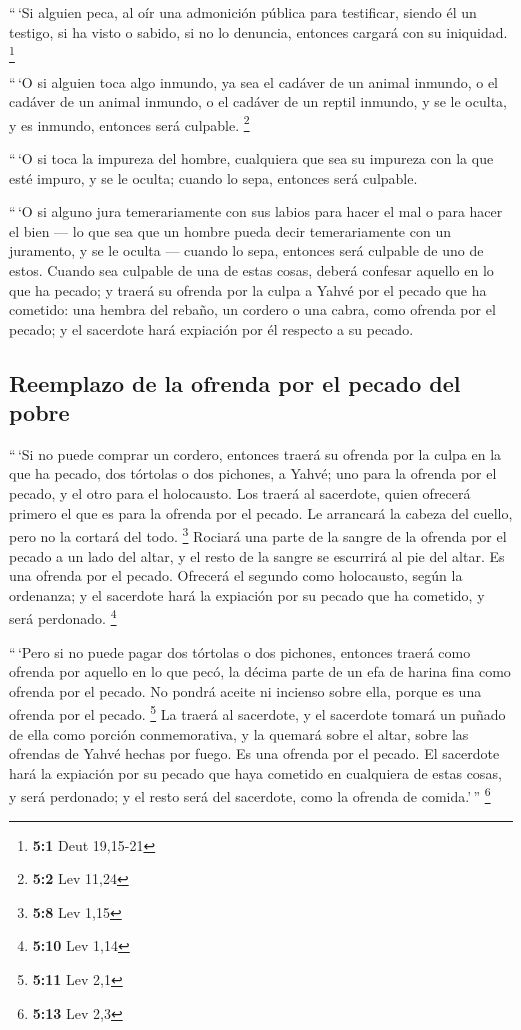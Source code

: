  ``\,`Si alguien peca, al oír una admonición pública para
testificar, siendo él un testigo, si ha visto o sabido, si no lo
denuncia, entonces cargará con su iniquidad. \footnote{\textbf{5:1} Deut
  19,15-21}

 ``\,`O si alguien toca algo inmundo, ya sea el cadáver de
un animal inmundo, o el cadáver de un animal inmundo, o el cadáver de un
reptil inmundo, y se le oculta, y es inmundo, entonces será culpable.
\footnote{\textbf{5:2} Lev 11,24}

 ``\,`O si toca la impureza del hombre, cualquiera que sea
su impureza con la que esté impuro, y se le oculta; cuando lo sepa,
entonces será culpable.

 ``\,`O si alguno jura temerariamente con sus labios para
hacer el mal o para hacer el bien --- lo que sea que un hombre pueda
decir temerariamente con un juramento, y se le oculta --- cuando lo
sepa, entonces será culpable de uno de estos.  Cuando sea
culpable de una de estas cosas, deberá confesar aquello en lo que ha
pecado;  y traerá su ofrenda por la culpa a Yahvé por el
pecado que ha cometido: una hembra del rebaño, un cordero o una cabra,
como ofrenda por el pecado; y el sacerdote hará expiación por él
respecto a su pecado.

\hypertarget{reemplazo-de-la-ofrenda-por-el-pecado-del-pobre}{%
\subsection{Reemplazo de la ofrenda por el pecado del
pobre}\label{reemplazo-de-la-ofrenda-por-el-pecado-del-pobre}}

 ``\,`Si no puede comprar un cordero, entonces traerá su
ofrenda por la culpa en la que ha pecado, dos tórtolas o dos pichones, a
Yahvé; uno para la ofrenda por el pecado, y el otro para el holocausto.
 Los traerá al sacerdote, quien ofrecerá primero el que es
para la ofrenda por el pecado. Le arrancará la cabeza del cuello, pero
no la cortará del todo. \footnote{\textbf{5:8} Lev 1,15} 
Rociará una parte de la sangre de la ofrenda por el pecado a un lado del
altar, y el resto de la sangre se escurrirá al pie del altar. Es una
ofrenda por el pecado.  Ofrecerá el segundo como
holocausto, según la ordenanza; y el sacerdote hará la expiación por su
pecado que ha cometido, y será perdonado. \footnote{\textbf{5:10} Lev
  1,14}

 ``\,`Pero si no puede pagar dos tórtolas o dos pichones,
entonces traerá como ofrenda por aquello en lo que pecó, la décima parte
de un efa de harina fina como ofrenda por el pecado. No pondrá aceite ni
incienso sobre ella, porque es una ofrenda por el pecado. \footnote{\textbf{5:11}
  Lev 2,1}  La traerá al sacerdote, y el sacerdote tomará
un puñado de ella como porción conmemorativa, y la quemará sobre el
altar, sobre las ofrendas de Yahvé hechas por fuego. Es una ofrenda por
el pecado.  El sacerdote hará la expiación por su pecado
que haya cometido en cualquiera de estas cosas, y será perdonado; y el
resto será del sacerdote, como la ofrenda de comida.'\,'' \footnote{\textbf{5:13}
  Lev 2,3}

